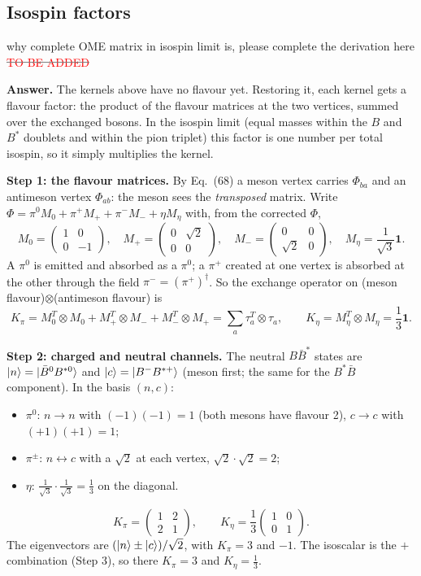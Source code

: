 \documentclass[11pt,a4paper]{article}
\newcommand{\todo}{\textcolor{red}{TO BE ADDED}}
\newcommand{\aifix}[2]{\textcolor{gray}{\sout{#1}} \textcolor{aicolor}{#2}}
\newcommand{\aifix}[2]{#2}
\newenvironment{aiadd}{\par}{\par}
\begin{document}
\subsection{Isospin factors}

why complete OME matrix in isospin limit is, please complete the derivation here \aifix{\todo}{}

\begin{aiadd}
	\textbf{Answer.} The kernels above have no flavour yet. Restoring it, each kernel gets a flavour factor: the product of the flavour matrices at the two vertices, summed over the exchanged bosons. In the isospin limit (equal masses within the $B$ and $B^*$ doublets and within the pion triplet) this factor is one number per total isospin, so it simply multiplies the kernel.

	\textbf{Step 1: the flavour matrices.} By Eq.~(68) a meson vertex carries $\Phi_{ba}$ and an antimeson vertex $\Phi_{ab}$: the meson sees the \emph{transposed} matrix. Write $\Phi=\pi^0M_0+\pi^+M_++\pi^-M_-+\eta M_\eta$ with, from the corrected $\Phi$,
	\[
		M_0=\begin{pmatrix}1&0\\0&-1\end{pmatrix},\quad
		M_+=\begin{pmatrix}0&\sqrt2\\0&0\end{pmatrix},\quad
		M_-=\begin{pmatrix}0&0\\ \sqrt2&0\end{pmatrix},\quad
		M_\eta=\frac{1}{\sqrt3}\bm 1 .
	\]
	A $\pi^0$ is emitted and absorbed as a $\pi^0$; a $\pi^+$ created at one vertex is absorbed at the other through the field $\pi^-=(\pi^+)^\dagger$. So the exchange operator on (meson flavour)$\otimes$(antimeson flavour) is
	\[
		K_\pi=M_0^T\otimes M_0+M_+^T\otimes M_-+M_-^T\otimes M_+=\sum_a\tau_a^T\otimes\tau_a,\qquad
		K_\eta=M_\eta^T\otimes M_\eta=\frac13\bm 1 .
	\]

	\textbf{Step 2: charged and neutral channels.} The neutral $B\bar B^*$ states are $\ket n=\ket{\bar B^0B^{*0}}$ and $\ket c=\ket{B^-B^{*+}}$ (meson first; the same for the $B^*\bar B$ component). In the basis $(n,c)$:
	\begin{itemize}
		\item $\pi^0$: $n\to n$ with $(-1)(-1)=1$ (both mesons have flavour 2), $c\to c$ with $(+1)(+1)=1$;
		\item $\pi^\pm$: $n\leftrightarrow c$ with a $\sqrt2$ at each vertex, $\sqrt2\cdot\sqrt2=2$;
		\item $\eta$: $\frac{1}{\sqrt3}\cdot\frac{1}{\sqrt3}=\frac13$ on the diagonal.
	\end{itemize}
	\[
		K_\pi=\begin{pmatrix}1&2\\2&1\end{pmatrix},\qquad K_\eta=\frac13\begin{pmatrix}1&0\\0&1\end{pmatrix}.
	\]
	The eigenvectors are $(\ket n\pm\ket c)/\sqrt2$, with $K_\pi=3$ and $-1$. The isoscalar is the $+$ combination (Step 3), so there $K_\pi=3$ and $K_\eta=\frac13$.


\end{aiadd}
\end{document}
